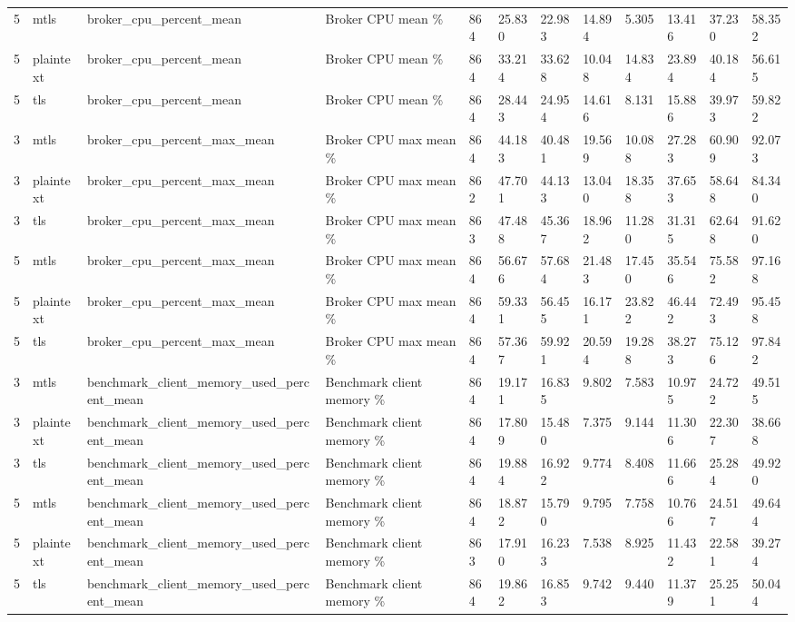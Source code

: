 \begin{longtable}{llllllllllll}
5 & mtls & broker\_cpu\_percent\_mean & Broker CPU mean \% & 864 & 25.830 & 22.983 & 14.894 & 5.305 & 13.416 & 37.230 & 58.352 \\
5 & plaintext & broker\_cpu\_percent\_mean & Broker CPU mean \% & 864 & 33.214 & 33.628 & 10.048 & 14.834 & 23.894 & 40.184 & 56.615 \\
5 & tls & broker\_cpu\_percent\_mean & Broker CPU mean \% & 864 & 28.443 & 24.954 & 14.616 & 8.131 & 15.886 & 39.973 & 59.822 \\
3 & mtls & broker\_cpu\_percent\_max\_mean & Broker CPU max mean \% & 864 & 44.183 & 40.481 & 19.569 & 10.088 & 27.283 & 60.909 & 92.073 \\
3 & plaintext & broker\_cpu\_percent\_max\_mean & Broker CPU max mean \% & 862 & 47.701 & 44.133 & 13.040 & 18.358 & 37.653 & 58.648 & 84.340 \\
3 & tls & broker\_cpu\_percent\_max\_mean & Broker CPU max mean \% & 863 & 47.488 & 45.367 & 18.962 & 11.280 & 31.315 & 62.648 & 91.620 \\
5 & mtls & broker\_cpu\_percent\_max\_mean & Broker CPU max mean \% & 864 & 56.676 & 57.684 & 21.483 & 17.450 & 35.546 & 75.582 & 97.168 \\
5 & plaintext & broker\_cpu\_percent\_max\_mean & Broker CPU max mean \% & 864 & 59.331 & 56.455 & 16.171 & 23.822 & 46.442 & 72.493 & 95.458 \\
5 & tls & broker\_cpu\_percent\_max\_mean & Broker CPU max mean \% & 864 & 57.367 & 59.921 & 20.594 & 19.288 & 38.273 & 75.126 & 97.842 \\
3 & mtls & benchmark\_client\_memory\_used\_percent\_mean & Benchmark client memory \% & 864 & 19.171 & 16.835 & 9.802 & 7.583 & 10.975 & 24.722 & 49.515 \\
3 & plaintext & benchmark\_client\_memory\_used\_percent\_mean & Benchmark client memory \% & 864 & 17.809 & 15.480 & 7.375 & 9.144 & 11.306 & 22.307 & 38.668 \\
3 & tls & benchmark\_client\_memory\_used\_percent\_mean & Benchmark client memory \% & 864 & 19.884 & 16.922 & 9.774 & 8.408 & 11.666 & 25.284 & 49.920 \\
5 & mtls & benchmark\_client\_memory\_used\_percent\_mean & Benchmark client memory \% & 864 & 18.872 & 15.790 & 9.795 & 7.758 & 10.766 & 24.517 & 49.644 \\
5 & plaintext & benchmark\_client\_memory\_used\_percent\_mean & Benchmark client memory \% & 863 & 17.910 & 16.233 & 7.538 & 8.925 & 11.432 & 22.581 & 39.274 \\
5 & tls & benchmark\_client\_memory\_used\_percent\_mean & Benchmark client memory \% & 864 & 19.862 & 16.853 & 9.742 & 9.440 & 11.379 & 25.251 & 50.044 \\

\end{longtable}
